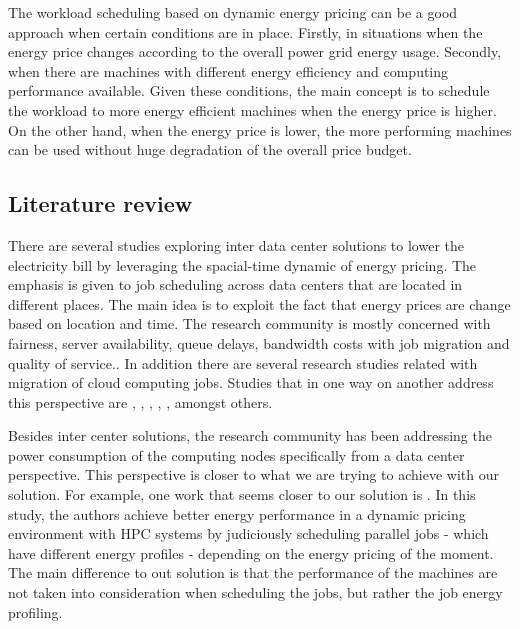 The workload scheduling based on dynamic energy pricing can be a good approach when certain conditions are in place. Firstly, in situations when the energy price changes according to the overall power grid energy usage. Secondly, when there are machines with different energy efficiency and computing performance available. Given these conditions, the main concept is to schedule the workload to more energy efficient machines when the energy price is higher. On the other hand, when the energy price is lower, the more performing machines can be used without huge degradation of the overall price budget.


\subsection*{Literature review}

There are several studies exploring inter data center solutions to lower
the electricity bill by leveraging the spacial-time dynamic of energy pricing. The 
emphasis is given to job scheduling across data centers that are located in 
different places. The main idea is to exploit the fact that energy prices 
are change based on location and time. The research community is mostly concerned 
with fairness, server availability, queue delays, bandwidth costs with job migration
and quality of service.. In addition there are several research studies related with 
migration of cloud computing jobs. Studies that in one way on another address this 
perspective are \cite{EFF_JOB_SCHEDULING}, \cite{MIGRATION_CLOUD}, 
\cite{MINIMIZING_DIST}, \cite{CUTTING_BILL}, \cite{SCHED_HETEROGE}, amongst others. 

Besides inter center solutions, the research community has been addressing the power 
consumption of the computing nodes specifically from a data center perspective.
This perspective is closer to what we are trying to achieve with our solution.
For example, one work that seems closer to our solution is \cite{DYN_PRICING_HPC}.
In this study, the authors achieve better energy performance in a dynamic
pricing environment with HPC systems by judiciously scheduling parallel jobs -
which have different energy profiles - depending on the energy pricing of the
moment. The main difference to out solution is that the performance of the machines 
are not taken into consideration when scheduling the jobs, but rather the job energy 
profiling.

